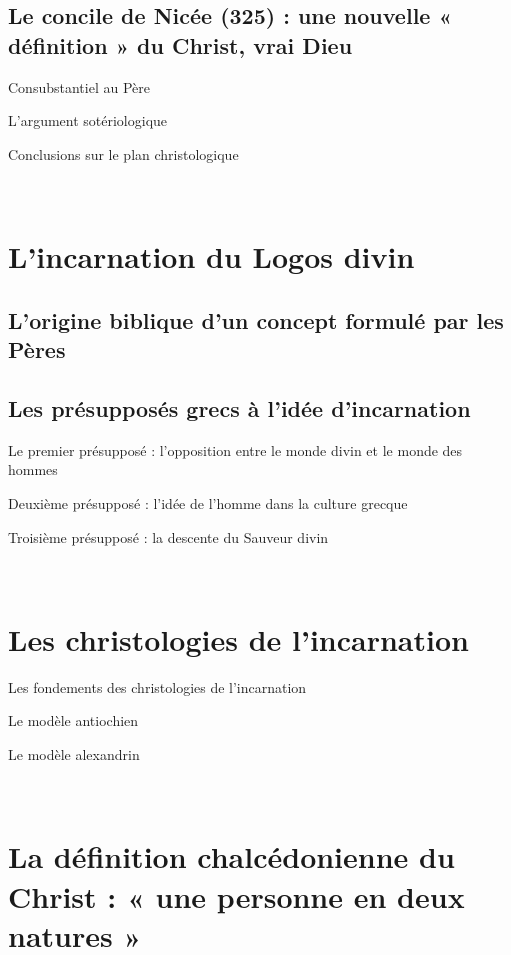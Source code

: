     \subsection{Le concile de Nicée (325) : une nouvelle « définition » du
    Christ, vrai Dieu}

    
    
    
      Consubstantiel au Père
    
      L'argument sotériologique
    
      Conclusions sur le plan christologique
    

 ~
  \hypertarget{lincarnation-du-logos-divin}{%
  \section{L'incarnation du Logos
  divin}\label{lincarnation-du-logos-divin}}

  
  
  
    \subsection{L'origine biblique d'un concept formulé par les Pères}
  
    \subsection{Les présupposés grecs à l'idée d'incarnation}

    
    
    
      Le premier présupposé : l'opposition entre le monde divin et le
      monde des hommes
    
      Deuxième présupposé : l'idée de l'homme dans la culture grecque
    
      Troisième présupposé : la descente du Sauveur divin
    
  
 ~
  \hypertarget{les-christologies-de-lincarnation}{%
  \section{Les christologies de
  l'incarnation}\label{les-christologies-de-lincarnation}}

  
  
  
    Les fondements des christologies de l'incarnation
  
    Le modèle antiochien
  
    Le modèle alexandrin
  
 ~
  \hypertarget{la-duxe9finition-chalcuxe9donienne-du-christ-une-personne-en-deux-natures}{%
  \section{La définition chalcédonienne du Christ : « une personne en
  deux natures
  »}\label{la-duxe9finition-chalcuxe9donienne-du-christ-une-personne-en-deux-natures}}

